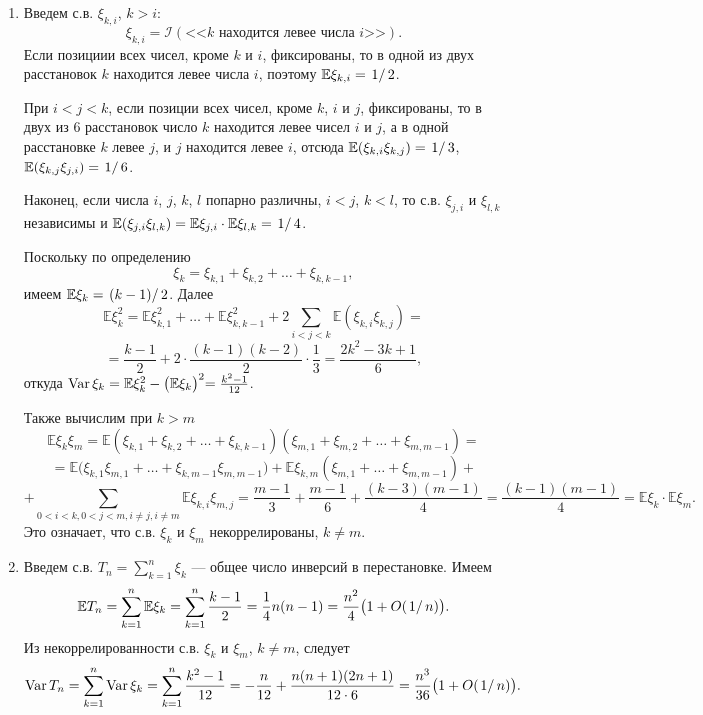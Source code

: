 \begin{solution}
\begin{enumerate}

\item Введем с.в. $\xi_{k,i}$, $k>i$: 
$$
\xi_{k,i}={\mathcal I}(\text{<<$k$ находится левее числа $i$>>}) . 
$$
Если позициии всех чисел, кроме $k$ и $i$, фиксированы, то в одной из двух расстановок $k$ находится левее числа $i$, поэтому 
${\mathbb E}\xi_{k,i}=\left.1\right/2$. 

При $i<j<k$, если позиции всех чисел, кроме $k$, $i$ и $j$, фиксированы, то в двух из $6$ расстановок число $k$ находится 
левее чисел $i$ и $j$, а в одной расстановке $k$ левее $j$, и $j$ находится левее $i$, отсюда 
${\mathbb E}(\xi_{k,i}\xi_{k,j})=\left.1\right/3$, ${\mathbb E}(\xi_{k,j}\xi_{j,i})=\left.1\right/6$. 

Наконец, если числа $i$, $j$, $k$, $l$ попарно различны, $i<j$, $k<l$, то с.в. $\xi_{j, i}$ и $\xi_{l,k}$ независимы и 
${\mathbb E}(\xi_{j,i}\xi_{l,k})={\mathbb E}\xi_{j,i}\cdot {\mathbb E}\xi_{l,k}=\left.1\right/4$. 

Поскольку по определению 
$$
\xi_k=\xi_{k,1}+\xi_{k,2}+\ldots +\xi_{k,k-1}, 
$$
имеем ${\mathbb E}\xi_k=\left.(k-1)\right/2$. Далее 
$$
{\mathbb E}\xi_k^2={\mathbb E}\xi_{k,1}^2+\ldots+{\mathbb E}\xi_{k,k-1}^2+2\sum\limits_{i<j<k}{\mathbb E}(\xi_{k,i}\xi_{k,j})=
$$
$$
=\frac{k-1}{2}+2\cdot\frac{(k-1)(k-2)}{2}\cdot\frac{1}{3}=\frac{2k^2-3k+1}{6} , 
$$
откуда $\mathop{\mathrm{Var}}\nolimits \xi_k={\mathbb E}\xi_k^2-\bigl({\mathbb E}\xi_k \bigl)^2=\frac{k^2-1}{12}$. 

Также вычислим при $k>m$
$$
{\mathbb E}\xi_k \xi_m={\mathbb E}(\xi_{k,1}+\xi_{k,2}+\ldots +\xi_{k,k-1})(\xi_{m,1}+\xi_{m,2}+\ldots +\xi_{m,m-1})=
$$
$$
={\mathbb E}\bigl( \xi_{k,1}\xi_{m,1}+\ldots +\xi_{k,m-1}\xi_{m,m-1} \bigr)+{\mathbb E}\xi_{k, m}(\xi_{m,1}+\ldots +\xi_{m,m-1})+
$$
$$
+\sum\limits_{0<i<k, 0<j<m, i\ne j, i\ne m}{\mathbb E}\xi_{k, i}\xi_{m,j}=\frac{m-1}{3}+
\frac{m-1}{6}+\frac{(k-3)(m-1)}{4}=\frac{(k-1)(m-1)}{4}= {\mathbb E}\xi_k \cdot{\mathbb E}\xi_m. 
$$
Это означает, что с.в. $\xi_k$ и $\xi_m$ некоррелированы, $k\ne m$. 

\item Введем с.в. $T_n=\sum\limits_{k=1}^{n}\xi_k$ --- общее число инверсий в перестановке. Имеем 
$$
{\mathbb E}T_n=\sum\limits_{k=1}^{n} {\mathbb E}\xi_k=\sum\limits_{k=1}^{n} \frac{k-1}{2}=
\frac{1}{4} n(n-1)=\frac{n^2}{4}\bigl(1+O(\left.1\right/n)\bigr) . 
$$
Из некоррелированности с.в. $\xi_k$ и $\xi_m$, $k\ne m$, следует
$$
\mathop{\mathrm{Var}}\nolimits T_n=\sum\limits_{k=1}^{n} \mathop{\mathrm{Var}}\nolimits \xi_k=
\sum\limits_{k=1}^{n}\frac{k^2-1}{12}=-\frac{n}{12}+\frac{n(n+1)(2n+1)}{12\cdot 6}=\frac{n^3}{36}\bigl(1+O(\left.1\right/n)\bigr) . 
$$


\end{enumerate}
\end{solution}
